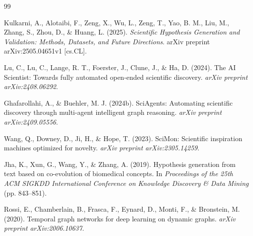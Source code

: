 \documentclass[11pt, a4paper]{article}
\begin{document}
\vspace{2em}
\begin{thebibliography}{99}
\setlength{\itemsep}{0.5em}

    Kulkarni, A., Alotaibi, F., Zeng, X., Wu, L., Zeng, T., Yao, B. M., Liu, M., Zhang, S., Zhou, D., \& Huang, L. (2025). 
    \textit{Scientific Hypothesis Generation and Validation: Methods, Datasets, and Future Directions}. 
    arXiv preprint arXiv:2505.04651v1 [cs.CL].

    Lu, C., Lu, C., Lange, R. T., Foerster, J., Clune, J., \& Ha, D. (2024). 
    The AI Scientist: Towards fully automated open-ended scientific discovery. 
    \textit{arXiv preprint arXiv:2408.06292}.

    Ghafarollahi, A., \& Buehler, M. J. (2024b). 
    SciAgents: Automating scientific discovery through multi-agent intelligent graph reasoning. 
    \textit{arXiv preprint arXiv:2409.05556}.

    Wang, Q., Downey, D., Ji, H., \& Hope, T. (2023). 
    SciMon: Scientific inspiration machines optimized for novelty. 
    \textit{arXiv preprint arXiv:2305.14259}.

    Jha, K., Xun, G., Wang, Y., \& Zhang, A. (2019). 
    Hypothesis generation from text based on co-evolution of biomedical concepts. 
    In \textit{Proceedings of the 25th ACM SIGKDD International Conference on Knowledge Discovery \& Data Mining} (pp. 843--851).

    Rossi, E., Chamberlain, B., Frasca, F., Eynard, D., Monti, F., \& Bronstein, M. (2020). 
    Temporal graph networks for deep learning on dynamic graphs. 
    \textit{arXiv preprint arXiv:2006.10637}.

\end{thebibliography}
\end{document}
